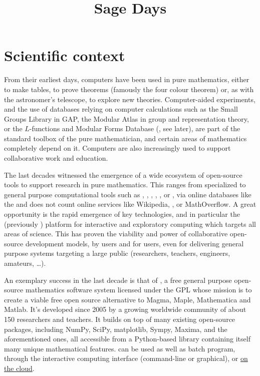 \documentclass[12pt]{amsbook}
\begin{document}
\title{Sage Days}

\section{Scientific context}


From their earliest days, computers have been used in pure
mathematics, either to make tables, to prove theorems (famously the
four colour theorem) or, as with the astronomer's telescope, to
explore new theories. Computer-aided experiments, and the use of
databases relying on computer calculations such as the Small Groups
Library in GAP, the Modular Atlas in group and representation theory,
or the $L$-functions and Modular Forms Database (\LMFDB, see later),
are part of the standard toolbox of the pure mathematician, and
certain areas of mathematics completely depend on it. Computers are
also increasingly used to support collaborative work and education.

The last decades witnessed the emergence of a wide ecosystem of
open-source tools to support research in pure mathematics. This ranges
from specialized to general purpose computational tools such as \GAP,
\PariGP, \Linbox, \MPIR, \Sage, or \Singular, via online databases
like the \LMFDB and does not count online services like Wikipedia,
\Arxiv, or MathOverflow. A great opportunity is the rapid emergence of
key technologies, and in particular the \Jupyter (previously \IPython)
platform for interactive and exploratory computing which targets all
areas of science. This has proven the viability and power of
collaborative open-source development models, by users and for users,
even for delivering general purpose systems targeting a large public
(researchers, teachers, engineers, amateurs, \ldots).

An exemplary success in the last decade is that of \Sage,
a free general purpose open-source mathematics
software system licensed under the GPL whose mission is to create a
viable free open source alternative to Magma, Maple, Mathematica and
Matlab. It's developed since 2005 by a growing worldwide community of
about 150 researchers and teachers. It builds on top of many existing
open-source packages, including NumPy, SciPy, matplotlib, Sympy,
Maxima, and the aforementioned ones, all accessible from a
Python-based library containing itself many unique mathematical
features. \Sage can be used as well as batch program, through the
\Jupyter interactive computing interface (command-line or graphical),
or \href{cloud.sagemath.org}{on the cloud}.
\end{document}
